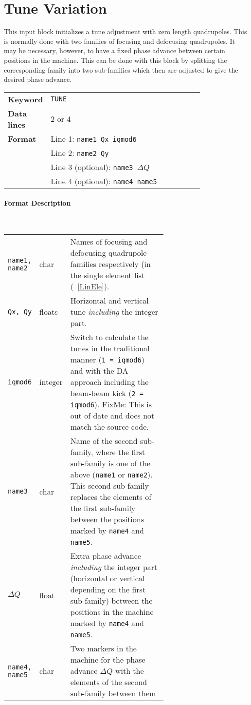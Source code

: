 \section{Tune Variation} \label{TunVar}

This input block initializes a tune adjustment with zero length quadrupoles.
This is normally done with two families of focusing and defocusing quadrupoles.
It may be necessary, however, to have a fixed phase advance between certain positions in the machine.
This can be done with this block by splitting the corresponding family into two sub-families which then are adjusted to give the desired phase advance.

\bigskip
\begin{tabular}{@{}lp{0.8\linewidth}}
    \textbf{Keyword}    & \texttt{TUNE} \\
    \textbf{Data lines} & 2 or 4 \\
    \textbf{Format}     & Line 1: \texttt{name1 Qx iqmod6} \\
                        & Line 2: \texttt{name2 Qy} \\
                        & Line 3 (optional): \texttt{name3 $\Delta Q$} \\
                        & Line 4 (optional): \texttt{name4 name5}
\end{tabular}

\paragraph{Format Description}~

\bigskip
\begin{longtabu}{@{}llp{0.65\linewidth}}
    \texttt{name1, name2} & char    & Names of focusing and defocusing quadrupole families respectively (in the single element list (~\ref{LinEle}). \\
    \texttt{Qx, Qy}       & floats  & Horizontal and vertical tune \emph{including} the integer part. \\
    \texttt{iqmod6}       & integer & Switch to calculate the tunes in the traditional manner (\texttt{1 = iqmod6}) and with the DA approach including the beam-beam kick (\texttt{2 = iqmod6}). FixMe: This is out of date and does not match the source code. \\
    \texttt{name3}        & char    & Name of the second sub-family, where the first sub-family is one of the above (\texttt{name1} or \texttt{name2}). This second sub-family replaces the elements of the first sub-family between the positions marked by \texttt{name4} and \texttt{name5}. \\
    \texttt{$\Delta Q$}   & float   & Extra phase advance \emph{including} the integer part (horizontal or vertical depending on the first sub-family) between the positions in the machine marked by \texttt{name4} and \texttt{name5}.\\
    \texttt{name4, name5} & char    & Two markers in the machine for the phase advance $\Delta Q$ with the elements of the second sub-family between them
\end{longtabu}


